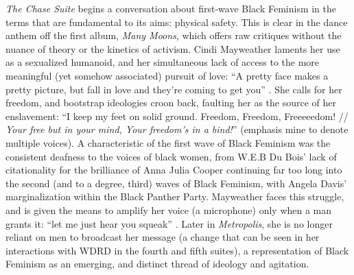 \documentclass[a4paper, 11pt]{article} %
\begin{document}
\emph{The Chase Suite} begins a conversation about first-wave Black Feminism in the terms that are fundamental to its aims: physical safety.
This is clear in the dance anthem off the first album, \emph{Many Moons}, which offers raw critiques without the nuance of theory or the kinetics of activism.
Cindi Mayweather laments her use as a sexualized humanoid, and her simultaneous lack of access to the more meaningful (yet somehow associated) pursuit of love: ``A pretty face makes a pretty picture, but fall in love and they're coming to get you'' \cite{happyhunting}.
She calls for her freedom, and bootstrap ideologies croon back, faulting her as the source of her enslavement: ``I keep my feet on solid ground. Freedom, Freedom, Freeeeedom! // \emph{Your free but in your mind, Your freedom's in a bind!}'' \cite{manymoons} (emphasis mine to denote multiple voices).
A characteristic of the first wave of Black Feminism was the consistent deafness to the voices of black women, from W.E.B Du Bois' lack of citationality for the brilliance of Anna Julia Cooper \cite{dubois} continuing far too long into the second (and to a degree, third) waves of Black Feminism, with Angela Davis' marginalization within the Black Panther Party.
Mayweather faces this struggle, and is given the means to amplify her voice (a microphone) only when a man grants it: ``let me just hear you squeak'' \cite{manymoons}.
Later in \emph{Metropolis}, she is no longer reliant on men to broadcast her message (a change that can be seen in her interactions with WDRD in the fourth and fifth suites)\cite{goodmorningmidnight}, a representation of Black Feminism as an emerging, and distinct thread of ideology and agitation. 
\end{document}
